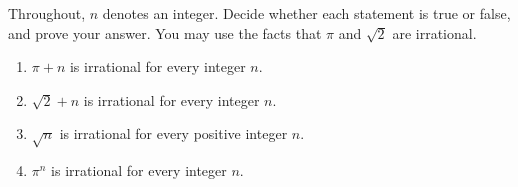 Throughout, $n$ denotes an integer. Decide whether each statement is true or false, and prove your answer. You may use the facts that $\pi$ and $\sqrt2$ are irrational.
\begin{enumerate}
\item[(a)] $\pi+n$ is irrational for every integer $n$.
\item[(b)] $\sqrt2+n$ is irrational for every integer $n$.
\item[(c)] $\sqrt n$ is irrational for every positive integer $n$.
\item[(d)] $\pi^n$ is irrational for every integer $n$.
\end{enumerate}
